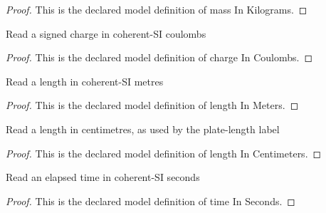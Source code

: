 \begin{proof}
  This is the declared model definition of mass In Kilograms.
\end{proof}
\begin{definition}
  \label{def:physics:phyx-mini-0909:phyxminiproblems-problemphyxmini0909-chargeincoulombs}
  Read a signed charge in coherent-SI coulombs
\end{definition}
\begin{proof}
  This is the declared model definition of charge In Coulombs.
\end{proof}
\begin{definition}
  \label{def:physics:phyx-mini-0909:phyxminiproblems-problemphyxmini0909-lengthinmeters}
  Read a length in coherent-SI metres
\end{definition}
\begin{proof}
  This is the declared model definition of length In Meters.
\end{proof}
\begin{definition}
  \label{def:physics:phyx-mini-0909:phyxminiproblems-problemphyxmini0909-lengthincentimeters}
  Read a length in centimetres, as used by the plate-length label
\end{definition}
\begin{proof}
  This is the declared model definition of length In Centimeters.
\end{proof}
\begin{definition}
  \label{def:physics:phyx-mini-0909:phyxminiproblems-problemphyxmini0909-timeinseconds}
  Read an elapsed time in coherent-SI seconds
\end{definition}
\begin{proof}
  This is the declared model definition of time In Seconds.
\end{proof}
